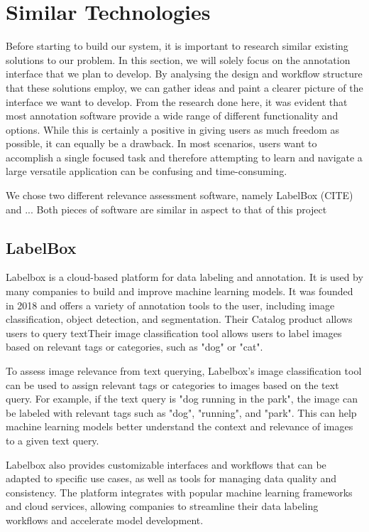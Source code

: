\documentclass{l4proj}
\begin{document}
\section{Similar Technologies}
Before starting to build our system, it is important to research similar existing solutions to our problem. In this section, we will solely focus on the annotation interface that we plan to develop. By analysing the design and workflow structure that these solutions employ, we can gather ideas and paint a clearer picture of the interface we want to develop. From the research done here, it was evident that most annotation software provide a wide range of different functionality and options. While this is certainly a positive in giving users as much freedom as possible, it can equally be a drawback. In most scenarios, users want to accomplish a single focused task and therefore attempting to learn and navigate a large versatile application can be confusing and time-consuming.

We chose two different relevance assessment software, namely LabelBox \cite{labelbox} (CITE) and ... Both pieces of software are similar in aspect to that of this project

\subsection{LabelBox}
Labelbox is a cloud-based platform for data labeling and annotation. It is used by many companies to build and improve machine learning models. It was founded in 2018 and offers a variety of annotation tools to the user, including image classification, object detection, and segmentation. Their Catalog product allows users to query textTheir image classification tool allows users to label images based on relevant tags or categories, such as "dog" or "cat".

To assess image relevance from text querying, Labelbox's image classification tool can be used to assign relevant tags or categories to images based on the text query. For example, if the text query is "dog running in the park", the image can be labeled with relevant tags such as "dog", "running", and "park". This can help machine learning models better understand the context and relevance of images to a given text query.

Labelbox also provides customizable interfaces and workflows that can be adapted to specific use cases, as well as tools for managing data quality and consistency. The platform integrates with popular machine learning frameworks and cloud services, allowing companies to streamline their data labeling workflows and accelerate model development.
\end{document}
